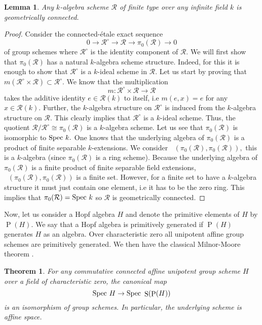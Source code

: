 \documentclass[a4paper, 12pt]{amsart}
\DeclareMathOperator{\Prim}{P}
\DeclareMathOperator{\Schk}{Sch_k}
\DeclareMathOperator{\Sym}{S}
\numberwithin{equation}{section}
\newtheorem{lemma}[equation]{Lemma}
\newtheorem{theorem}{Theorem}[section]
\theoremstyle{definition}
\begin{document}
\begin{lemma}
Any $k$-algebra scheme $\mathcal{R}$ of finite type over any infinite field $k$ is geometrically connected. 
\end{lemma}
\begin{proof}
Consider the connected-étale exact sequence $$0 \rightarrow \mathcal{R}^\circ \rightarrow \mathcal{R} \rightarrow \pi_0(\mathcal{R}) \rightarrow 0$$ of group schemes where $\mathcal{R}^\circ$ is the identity component of $\mathcal{R}.$ We will first show that $\pi_0(\mathcal{R})$ has a natural $k$-algebra scheme structure. Indeed, for this it is enough to show that $\mathcal{R}^\circ$ is a $k$-ideal scheme in $\mathcal{R}$. Let us start by proving that $m(\mathcal{R}^\circ \times \mathcal{R}) \subset \mathcal{R}^\circ.$ We know that the multiplication $$m:\mathcal{R}^\circ \times \mathcal{R} \rightarrow \mathcal{R}$$  takes the additive identity $e \in \mathcal{R}(k)$ to itself, i.e $m(e,x)=e$ for any $x \in \mathcal{R}(k).$ Further, the $k$-algebra structure on $\mathcal{R}^\circ$ is induced from the $k$-algebra structure on $\mathcal{R}.$ This clearly implies that $\mathcal{R}^\circ$ is a $k$-ideal scheme. Thus, the quotient $\mathcal{R}/\mathcal{R}^\circ \cong \pi_0(\mathcal{R})$ is a $k$-algebra scheme. Let us see that $\pi_0(\mathcal{R})$ is isomorphic to $\text{Spec } k.$ One knows that the underlying algebra of $\pi_0(\mathcal{R})$ is a product of finite separable $k$-extensions. We consider $\Schk(\pi_0(\mathcal{R}),\pi_0(\mathcal{R})),$ this is a $k$-algebra (since $\pi_0(\mathcal{R})$ is a ring scheme). Because the underlying algebra of $\pi_0(\mathcal{R})$ is a finite product of finite separable field extensions, $\Schk(\pi_0(\mathcal{R}),\pi_0(\mathcal{R}))$ is a finite set.   However, for a finite set to have a $k$-algebra structure it must just contain one element, i.e it has to be the zero ring. This implies that $\pi_0(\mathcal{R}) = \text{Spec } k$ so  $\mathcal{R}$ is geometrically connected. 
\end{proof}
\noindent Now, let us consider a Hopf algebra $H$ and denote the primitive elements of $H$ by $\Prim(H).$ We say that a Hopf algebra is primitively generated if $\Prim(H)$ generates $H$ as an algebra. Over characteristic zero all unipotent affine group schemes are primitively generated. We then have the classical Milnor-Moore theorem \cite{Milnor65}.
\begin{theorem}
For any commutative connected affine unipotent group scheme $H$ over a field of characteristic zero, the canonical map $$\Spec H \rightarrow  \Spec \Sym(\Prim(H))$$ is an isomorphism of group schemes. In particular, the underlying scheme is affine space.
\end{theorem}
\end{document}
